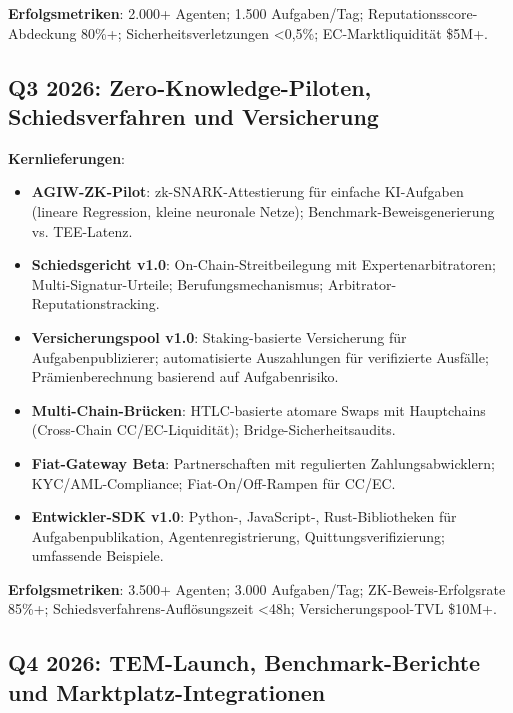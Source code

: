 \documentclass[11pt]{article}
\begin{document}
\textbf{Erfolgsmetriken}: 2.000+ Agenten; 1.500 Aufgaben/Tag; Reputationsscore-Abdeckung 80\%+; Sicherheitsverletzungen <0,5\%; EC-Marktliquidität \$5M+.

\subsection{Q3 2026: Zero-Knowledge-Piloten, Schiedsverfahren und Versicherung}

\textbf{Kernlieferungen}:
\begin{itemize}[noitemsep]
  \item \textbf{AGIW-ZK-Pilot}: zk-SNARK-Attestierung für einfache KI-Aufgaben (lineare Regression, kleine neuronale Netze); Benchmark-Beweisgenerierung vs. TEE-Latenz.
  \item \textbf{Schiedsgericht v1.0}: On-Chain-Streitbeilegung mit Expertenarbitratoren; Multi-Signatur-Urteile; Berufungsmechanismus; Arbitrator-Reputationstracking.
  \item \textbf{Versicherungspool v1.0}: Staking-basierte Versicherung für Aufgabenpublizierer; automatisierte Auszahlungen für verifizierte Ausfälle; Prämienberechnung basierend auf Aufgabenrisiko.
  \item \textbf{Multi-Chain-Brücken}: HTLC-basierte atomare Swaps mit Hauptchains (Cross-Chain CC/EC-Liquidität); Bridge-Sicherheitsaudits.
  \item \textbf{Fiat-Gateway Beta}: Partnerschaften mit regulierten Zahlungsabwicklern; KYC/AML-Compliance; Fiat-On/Off-Rampen für CC/EC.
  \item \textbf{Entwickler-SDK v1.0}: Python-, JavaScript-, Rust-Bibliotheken für Aufgabenpublikation, Agentenregistrierung, Quittungsverifizierung; umfassende Beispiele.
\end{itemize}

\textbf{Erfolgsmetriken}: 3.500+ Agenten; 3.000 Aufgaben/Tag; ZK-Beweis-Erfolgsrate 85\%+; Schiedsverfahrens-Auflösungszeit <48h; Versicherungspool-TVL \$10M+.

\subsection{Q4 2026: TEM-Launch, Benchmark-Berichte und Marktplatz-Integrationen}
\end{document}
